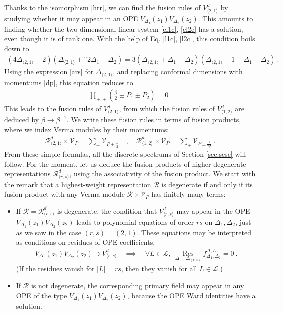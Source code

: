 \documentclass[12pt, a4paper]{article}
\theoremstyle{break}
\begin{document}
Thanks to the isomorphism \eqref{hrr}, we can find the fusion rules of $V^d_{\langle 2,1\rangle}$ by studying whether it may appear in an OPE $V_{\Delta_1}(z_1)V_{\Delta_2}(z_2)$. This amounts to finding whether the two-dimensional linear system \eqref{el1c}, \eqref{el2c} has a solution, even though it is of rank one. With the help of Eq. \eqref{l1c}, \eqref{l2c}, this condition boils down to 
\begin{align}
 \left(4\Delta_{\langle 2,1\rangle}+2\right) \left(\Delta_{\langle 2,1\rangle}+¨2\Delta_1-\Delta_2\right) = 3\left(\Delta_{\langle 2,1\rangle}+\Delta_1-\Delta_2\right)\left(\Delta_{\langle 2,1\rangle}+1+\Delta_1-\Delta_2\right)\ .
\end{align}
Using the expression \eqref{ars} for $\Delta_{\langle 2,1\rangle}$, and replacing conformal dimensions with momentums \eqref{dp}, this equation reduces to 
\begin{align}
 \prod_{\pm,\pm}\left(\tfrac{\beta}{2}\pm P_1\pm P_2\right) = 0\ . 
\end{align}
This leads to the fusion rules of $V^d_{\langle 2,1\rangle}$, from which the fusion rules of $V^d_{\langle 1,2\rangle}$ are deduced by $\beta\to \beta^{-1}$. We write these fusion rules in terms of fusion products, where we index Verma modules by their momentums:
\begin{align}
 \boxed{\mathcal{R}^d_{\langle 2,1\rangle}\times \mathcal{V}_P = \sum_\pm \mathcal{V}_{P\pm \frac{\beta}{2}}} \quad, \quad \boxed{\mathcal{R}^d_{\langle 1,2\rangle}\times \mathcal{V}_P = \sum_\pm \mathcal{V}_{P\pm \frac{1}{2\beta}}}\ . 
 \label{rvvp}
\end{align}
From these simple formulas, all the discrete spectrums of Section \ref{sec:sesc} will follow. For the moment, let us deduce the fusion products of higher degenerate representations $\mathcal{R}^d_{\langle r,s\rangle}$, using the associativity of the fusion product. We start with the remark that a highest-weight representation $\mathcal{R}$ is degenerate if and only if its fusion product with any Verma module $\mathcal{R}\times \mathcal{V}_P$ has finitely many terms:
\begin{itemize}
 \item If $\mathcal{R}=\mathcal{R}^d_{\langle r,s\rangle}$ is degenerate, the condition that $V^d_{\langle r,s\rangle}$ may appear in the OPE $V_{\Delta_1}(z_1)V_{\Delta_2}(z_2)$ leads to polynomial equations of order $rs$ on $\Delta_1,\Delta_2$, just as we saw in the case $(r,s)=(2,1)$. These equations may be interpreted as conditions on residues of OPE coefficients,
 \begin{align}
  V_{\Delta_1}(z_1)V_{\Delta_2}(z_2) \supset V^d_{\langle r,s\rangle} \quad \implies \quad \forall L\in \mathcal{L},\ \underset{\Delta=\Delta_{(r,s)}}{\operatorname{Res}} f^{\Delta,L}_{\Delta_1,\Delta_2} = 0\ .
  \label{resf}
 \end{align}
 (If the residues vanish for $|L|=rs$, then they vanish for all $L\in\mathcal{L}$.)
 \item If $\mathcal{R}$ is not degenerate, the corresponding primary field may appear in any OPE of the type $V_{\Delta_1}(z_1)V_{\Delta_2}(z_2)$, because the OPE Ward identities have a solution. 
\end{itemize}
\end{document}
